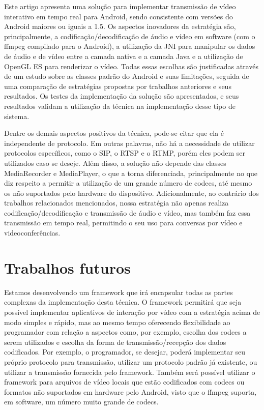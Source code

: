 \documentclass{acm_proc_article-sp}
\begin{document}
Este artigo apresenta uma solução para implementar transmissão de vídeo interativo em tempo real para Android, sendo consistente com versões do Android maiores ou iguais a 1.5. Os aspectos inovadores da estratégia são, principalmente, a codificação/decodificação de áudio e vídeo em software (com o ffmpeg compilado para o Android), a utilização da JNI para manipular os dados de áudio e de vídeo entre a camada nativa e a camada Java e a utilização de OpenGL ES para renderizar o vídeo. Todas essas escolhas são justificadas através de um estudo sobre as classes padrão do Android e suas limitações, seguida de uma comparação de estratégias propostas por trabalhos anteriores e seus resultados. Os testes da implementação da solução são apresentados, e seus resultados validam a utilização da técnica na implementação desse tipo de sistema.

Dentre os demais aspectos positivos da técnica, pode-se citar que ela é independente de protocolo. Em outras palavras, não há a necessidade de utilizar protocolos específicos, como o SIP, o RTSP e o RTMP, porém eles podem ser utilizados caso se deseje. Além disso, a solução não depende das classes MediaRecorder e MediaPlayer, o que a torna diferenciada, principalmente no que diz respeito a permitir a utilização de um grande número de codecs, até mesmo os não suportados pelo hardware do dispositivo. Adicionalmente, ao contrário dos trabalhos relacionados mencionados, nossa estratégia não apenas realiza codificação/decodificação e transmissão de áudio e vídeo, mas também faz essa transmissão em tempo real, permitindo o seu uso para conversas por vídeo e videoconferências.

\section{Trabalhos futuros}

Estamos desenvolvendo um framework que irá encapsular todas as partes complexas da implementação desta técnica. O framework permitirá que seja possível implementar aplicativos de interação por vídeo com a estratégia acima de modo simples e rápido, mas ao mesmo tempo oferecendo flexibilidade ao programador com relação a aspectos como, por exemplo, escolha dos codecs a serem utilizados e escolha da forma de transmissão/recepção dos dados codificados. Por exemplo, o programador, se desejar, poderá implementar seu próprio protocolo para transmissão, utilizar um protocolo padrão já existente, ou utilizar a transmissão fornecida pelo framework. Também será possível utilizar o framework para arquivos de vídeo locais que estão codificados com codecs ou formatos não suportados em hardware pelo Android, visto que o ffmpeg suporta, em software, um número muito grande de codecs.

%

%
%
\balancecolumns
\end{document}
